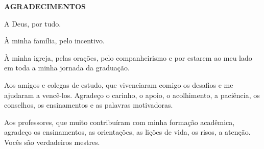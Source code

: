 \documentclass[a4paper]{article}
\begin{document}
\restoregeometry
\begin{titlepage}
	\begin{center}
		{\large \textbf{AGRADECIMENTOS}}\\[1cm]
	\end{center}

	A Deus, por tudo.
	
	À minha família, pelo incentivo.
	
	À minha igreja, pelas orações, pelo companheirismo e por estarem ao meu lado em toda a minha jornada da graduação.
	
	Aos amigos e colegas de estudo, que vivenciaram comigo os desafios e me ajudaram a vencê-los. Agradeço o carinho, o apoio, o acolhimento, a paciência, os conselhos, os ensinamentos e as palavras motivadoras.
	
	Aos professores, que muito contribuíram com minha formação acadêmica, agradeço os ensinamentos, as orientações, as lições de vida, os risos, a atenção. Vocês são verdadeiros mestres.	
\end{titlepage}
\end{document}
